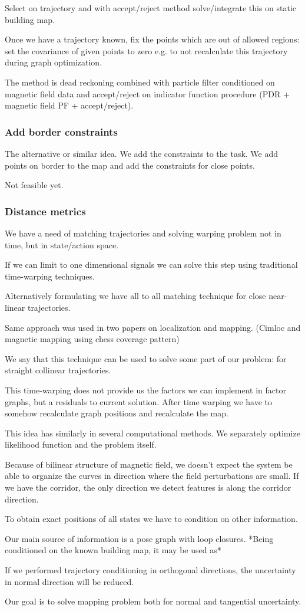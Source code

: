 Select on trajectory and with accept/reject method solve/integrate this on static building map. 

Once we have a trajectory known, fix the points which are out of allowed regions: set the covariance of given points to zero e.g. to not recalculate this trajectory during graph optimization.

The method is dead reckoning combined with particle filter conditioned on magnetic field data and accept/reject on indicator function procedure (PDR + magnetic field PF + accept/reject).


\subsubsection*{Add border constraints}

The alternative or similar idea. We add the constraints to the task. We add points on border to the map and add the constraints for close points.

Not feasible yet.

\subsubsection*{Distance metrics}

We have a need of matching trajectories and solving warping problem not in time, but in state/action space.

If we can limit to one dimensional signals we can solve this step using traditional time-warping techniques.

Alternatively formulating we have all to all matching technique for close near-linear trajectories. 

Same approach was used in two papers on localization and mapping. (Cimloc and magnetic mapping using chess coverage pattern)

We say that this technique can be used to solve some part of our problem: for straight collinear trajectories. 

This time-warping does not provide us the factors we can implement in factor graphs, but a residuals to current solution. After time warping we have to somehow recalculate graph positions and recalculate the map.

This idea has similarly in several computational methods. We separately optimize likelihood function and the problem itself.

Because of bilinear structure of magnetic field, we doesn't expect the system be able to organize the curves in direction where the field perturbations are small. If we have the corridor, the only direction we detect features is along the corridor direction.

To obtain exact positions of all states we have to condition on other information. 

Our main source of information is a pose graph with loop closures. *Being conditioned on the known building map, it may be used as* 

If we performed trajectory conditioning in orthogonal directions, the uncertainty in normal direction will be reduced. 

Our goal is to solve mapping problem both for normal and tangential uncertainty.
